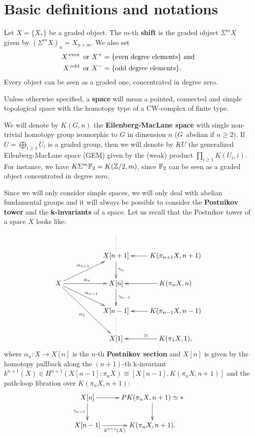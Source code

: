 \section{Basic definitions and notations}

Let $X=\{X_*\}$ be a graded object. The $m$-th {\bf shift} is the graded object $\Sigma^m X$ given by $(\Sigma^m X)_n=X_{n+m}$. We also set
\begin{align*}
X\operatorname{^{even}}\text{ or }X^+&=\{\text{even degree elements}\}\text{ and}\\
X\operatorname{^{odd}}\text{ or }X^-&=\{\text{odd degree elements}\}.
\end{align*}
Every object can be seen as a graded one, concentrated in degree zero. 

Unless otherwise specified, a {\bf space} will mean a pointed, connected and simple topological space with the homotopy type of a CW-complex of finite type. 

We will denote by $K(G,n)$ the {\bf Eilenberg-MacLane space} with single non-trivial homotopy group isomorphic to $G$ in dimension $n$ ($G$~abelian if $n\geq2$). If $U=\bigoplus_{i\geq 1}U_i$ is a graded group, then we will denote by $KU$ the generalized Eilenberg-MacLane space (GEM) given by the (weak) product $\prod_{i\geq 1}K(U_i,i)$. For instance, we have $K\Sigma^m\mathbb{F}_2=K(\mathbb{Z}/2,m)$, since $\mathbb{F}_2$ can be seen as a graded object concentrated in degree zero.

Since we will only consider simple spaces, we will only deal with abelian fundamental groups and it will always be possible to consider the {\bf Postnikov tower} and the {\bf k-invariants} of a space.  Let us recall that the Postnikov tower of a space $X$ looks like:
$$\xymatrix{
&&\\
&&X[n+1] \ar@{.}[u] \ar[d]^{\gamma_n} &K(\pi_{n+1}X,n+1) \ar[l] \\
X\ar[rru]^{\alpha_{n+1}}
\ar[rr]^{\alpha_n}
\ar[rrd]^{\alpha_{n-1}}
\ar[rrdd]_{\alpha_1}
&&X[n] \ar[d]^{\gamma_{n-1}} &K(\pi_{n}X,n) \ar[l] \\
&&X[n-1] \ar@{.}[d] &K(\pi_{n-1}X,n-1) \ar[l] \\
&&X[1] &K(\pi_1 X,1), \ar[l]_\simeq
}$$ where $\alpha_n:X\to X[n]$ is the $n$-th {\bf Postnikov section} and $X[n]$ is given by the homotopy pullback along the $(n+1)$-th k-invariant $k^{n+1}(X)\in H^{n+1}(X[n-1];\pi_n X)\cong[X[n-1],K(\pi_n X,n+1)]$ and the path-loop fibration over $K(\pi_n X,n+1)$:
$$\xymatrix{
X[n]\ar[r]\ar[d]_{\gamma_{n-1}} &PK(\pi_n X,n+1)\simeq{*}\ar[d]\\
X[n-1]\ar[r]_-{k^{n+1}(X)} &K(\pi_n X,n+1).
}$$

